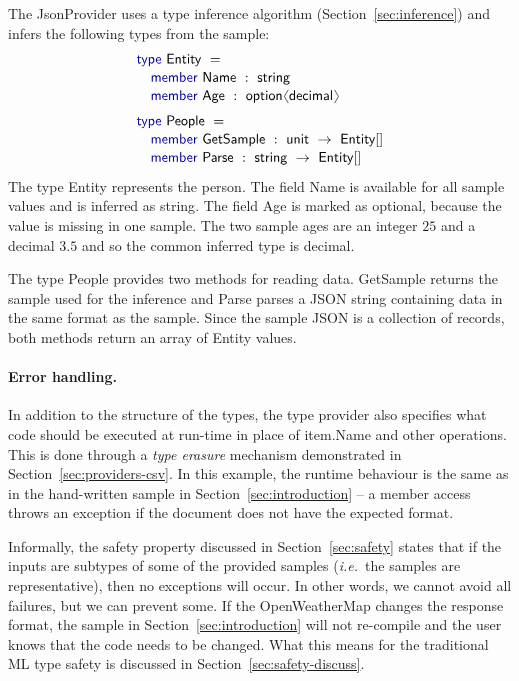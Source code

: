 \documentclass[preprint]{sigplanconf}
\newcommand{\langl}{\begin{picture}(4.5,7)
\put(1.1,2.5){\rotatebox{60}{\line(1,0){5.5}}}
\put(1.1,2.5){\rotatebox{300}{\line(1,0){5.5}}}
\end{picture}}
\newcommand{\rangl}{\begin{picture}(4.5,7)
\put(.9,2.5){\rotatebox{120}{\line(1,0){5.5}}}
\put(.9,2.5){\rotatebox{240}{\line(1,0){5.5}}}
\end{picture}}
\newcommand{\kvd}[1]{\textnormal{\textcolor{kvdclr}{\sffamily #1}}}
\newcommand{\ident}[1]{\textnormal{\sffamily #1}}
\begin{document}
The \ident{JsonProvider} uses a type inference algorithm (Section~\ref{sec:inference})  and
infers the following types from the sample:
%
\begin{equation*}
\begin{array}{l}
 \kvd{type}~\ident{Entity}~=  \\[0.1em]
 \quad \kvd{member}~\ident{Name}~:~\ident{string} \\[0.1em]
 \quad \kvd{member}~\ident{Age}~:~\ident{option}\langl \ident{decimal}\rangl \\[0.6em]
 \kvd{type}~\ident{People}~=  \\[0.1em]
 \quad \kvd{member}~\ident{GetSample}~:~\ident{unit}~\rightarrow~\ident{Entity}[] \\[0.1em]
 \quad \kvd{member}~\ident{Parse}~:~\ident{string}~\rightarrow~\ident{Entity}[] \\[0.1em]
\end{array}
\end{equation*}
%
The type \ident{Entity} represents the person. The field \ident{Name} is available for all
sample values and is inferred as \ident{string}. The field \ident{Age} is marked as optional,
because the value is missing in one sample. The two sample ages are an integer $25$ and a 
decimal $3.5$ and so the common inferred type is \ident{decimal}.

The type \ident{People} provides two methods for reading data. \ident{GetSample} returns the
sample used for the inference and \ident{Parse} parses a JSON string containing data in the same 
format as the sample. Since the sample JSON is a collection of records, both methods return an 
array of \ident{Entity} values.

\paragraph{Error handling.}
In addition to the structure of the types, the type provider also specifies what code should be 
executed at run-time in place of \ident{item.Name} and other operations. This is done through a 
\emph{type erasure} mechanism demonstrated in Section~\ref{sec:providers-csv}. In this example,
the runtime behaviour is the same as in the hand-written sample in Section~\ref{sec:introduction} --
a member access throws an exception if the document does not have the expected format.

Informally, the safety property discussed in Section~\ref{sec:safety} states that if the inputs
are subtypes of some of the provided samples (\emph{i.e.}~the samples are representative), then
no exceptions will occur. In other words, we cannot avoid all failures, but we can prevent some.
If the OpenWeatherMap changes the response format, the sample in Section~\ref{sec:introduction}
will not re-compile and the user knows that the code needs to be changed. What this means for
the traditional ML type safety is discussed in Section~\ref{sec:safety-discuss}.
\end{document}
